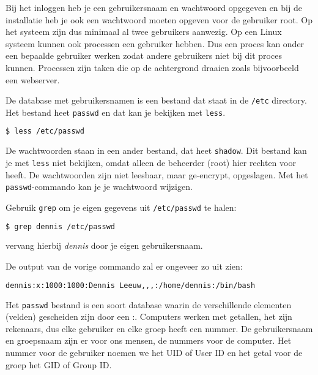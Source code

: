 Bij het inloggen heb je een gebruikersnaam en wachtwoord opgegeven en bij de installatie heb je ook een wachtwoord moeten opgeven voor de gebruiker root. Op het systeem zijn dus minimaal al twee gebruikers aanwezig. Op een Linux systeem kunnen ook processen een gebruiker hebben. Dus een proces kan onder een bepaalde gebruiker werken zodat andere gebruikers niet bij dit proces kunnen. Processen zijn taken die op de achtergrond draaien zoals bijvoorbeeld een webserver.

De database met gebruikersnamen is een bestand dat staat in de \texttt{/etc} directory. Het bestand heet \texttt{passwd} en dat kan je bekijken met \texttt{less}.

\begin{lstlisting}[language=bash]
$ less /etc/passwd
\end{lstlisting}

De wachtwoorden staan in een ander bestand, dat heet \texttt{shadow}. Dit bestand kan je met \texttt{less} niet bekijken, omdat alleen de beheerder (root) hier rechten voor heeft. De wachtwoorden zijn niet leesbaar, maar ge-encrypt, opgeslagen. Met het \texttt{passwd}-commando kan je je wachtwoord wijzigen.

Gebruik \texttt{grep} om je eigen gegevens uit \texttt{/etc/passwd} te halen:
\begin{lstlisting}[language=bash]
$ grep dennis /etc/passwd
\end{lstlisting}
vervang hierbij \textsl{dennis} door je eigen gebruikersnaam.

De output van de vorige commando zal er ongeveer zo uit zien:
\begin{lstlisting}[language=bash]
dennis:x:1000:1000:Dennis Leeuw,,,:/home/dennis:/bin/bash
\end{lstlisting}
Het \texttt{passwd} bestand is een soort database waarin de verschillende elementen (velden) gescheiden zijn door een :. Computers werken met getallen, het zijn rekenaars, dus elke gebruiker en elke groep heeft een nummer. De gebruikersnaam en groepsnaam zijn er voor ons mensen, de nummers voor de computer. Het nummer voor de gebruiker noemen we het UID of User ID en het getal voor de groep het GID of Group ID.

